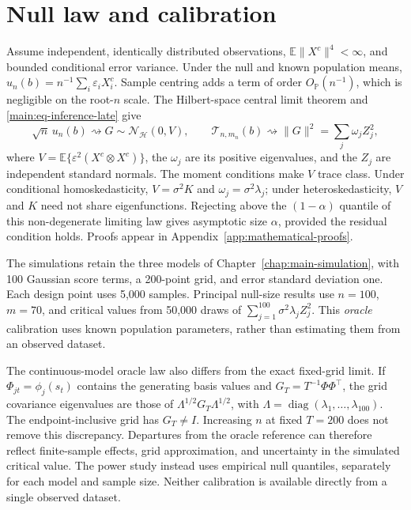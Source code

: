 \section{Null law and calibration}
\label{main:sec-inference-calibration}

Assume independent, identically distributed observations, $\mathbb E\|X^c\|^4<\infty$, and bounded
conditional error variance.  Under the null and known population means,
$u_n(b)=n^{-1}\sum_i\varepsilon_iX_i^c$.  Sample centring adds a term of
order $O_{\mathbb P}(n^{-1})$, which is negligible on the root-$n$ scale.
The Hilbert-space central limit theorem and
\eqref{main:eq-inference-late} give
\begin{equation}
 \sqrt n\,u_n(b)\rightsquigarrow G\sim\mathcal N_{\mathcal H}(0,V),
 \qquad
 \mathcal T_{n,m_n}(b)\rightsquigarrow
 \|G\|^2=\sum_j\omega_jZ_j^2,
 \label{main:eq-inference-null-law}
\end{equation}
where $V=\mathbb E\{\varepsilon^2(X^c\otimes X^c)\}$, the $\omega_j$ are
its positive eigenvalues, and the $Z_j$ are independent standard normals.
The moment conditions make $V$ trace class.  Under conditional
homoskedasticity, $V=\sigma^2K$ and $\omega_j=\sigma^2\lambda_j$;
under heteroskedasticity, $V$ and $K$ need not share eigenfunctions.
Rejecting above the $(1-\alpha)$ quantile of this non-degenerate limiting
law gives asymptotic size $\alpha$, provided the residual condition holds.
Proofs appear in Appendix~\ref{app:mathematical-proofs}.

The simulations retain the three models of
Chapter~\ref{chap:main-simulation}, with 100 Gaussian score terms, a
200-point grid, and error standard deviation one.  Each design point uses
5,000 samples.  Principal null-size results use $n=100$, $m=70$, and
critical values from 50,000 draws of
$\sum_{j=1}^{100}\sigma^2\lambda_jZ_j^2$.  This \emph{oracle} calibration
uses known population parameters, rather than estimating them from an
observed dataset.

The continuous-model oracle law also differs from the exact fixed-grid
limit.  If $\Phi_{jt}=\phi_j(s_t)$ contains the generating basis values and
$G_T=T^{-1}\Phi\Phi^\top$, the grid covariance eigenvalues are those of
$\Lambda^{1/2}G_T\Lambda^{1/2}$, with
$\Lambda=\operatorname{diag}(\lambda_1,\ldots,\lambda_{100})$.
The endpoint-inclusive grid has $G_T\neq I$.  Increasing $n$ at fixed
$T=200$ does not remove this discrepancy.  Departures from the oracle
reference can therefore reflect finite-sample effects, grid approximation,
and uncertainty in the simulated critical value.  The power study instead
uses empirical null quantiles, separately for each model and sample size.
Neither calibration is available directly from a single observed dataset.

